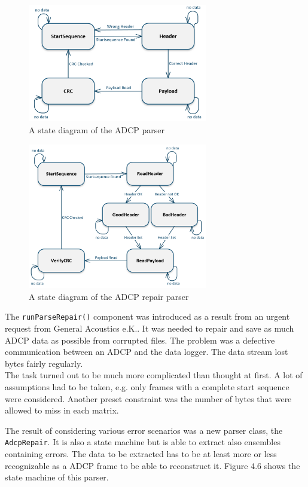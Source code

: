 \begin{figure}[ht]
\centering
      \includegraphics[width=0.7\textwidth]{parser}
        \caption{A state diagram of the ADCP parser}
\end{figure}
\begin{figure}[!hb]
\centering
      \includegraphics[width=0.7\textwidth]{repair}
        \caption{A state diagram of the ADCP repair parser}
\end{figure}
\pagebreak
The \texttt{runParseRepair()} component was introduced as a result from an urgent request from General Acoustics e.K.. It was needed to repair and save as much ADCP data as possible from corrupted files. The problem was a defective communication between an ADCP and the data logger. The data stream lost bytes fairly regularly.\\
The task turned out to be much more complicated than thought at first. A lot of assumptions had to be taken, e.g. only frames with a complete start sequence were considered. Another preset constraint was the number of bytes that were allowed to miss in each matrix. 

The result of considering various error scenarios was a new parser class, the \texttt{AdcpRepair}. It is also a state machine but is able to extract also ensembles containing errors. The data to be extracted has to be at least more or less recognizable as a ADCP frame to be able to reconstruct it. Figure 4.6 shows the state machine of this parser.


